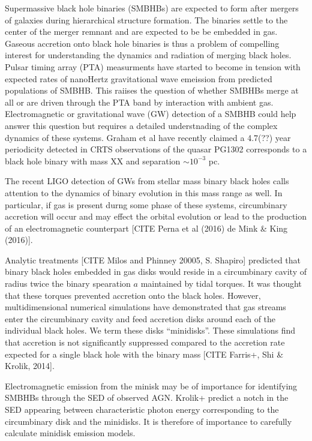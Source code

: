 \documentclass{emulateapj}
\begin{document}
Supermassive black hole binaries (SMBHBs) are expected to form after mergers of galaxies during hierarchical structure formation. The binaries settle to the center of the merger remnant and are expected to be be embedded in gas. Gaseous accretion onto black hole binaries is thus a problem of compelling interest for understanding the dynamics and radiation of merging black holes. Pulsar timing array (PTA) measurments have started to become in tension with expected rates of nanoHertz gravitational wave emeission from predicted populations of SMBHB. This raiises the question of whether SMBHBs merge at all or are driven through the PTA band by interaction with ambient gas. Electromagnetic or gravitational wave (GW) detection of a SMBHB could help answer this question but requires a detailed understnading of the complex dynamics of these systems. Graham et al have recently claimed a 4.7(??) year periodicity detected in CRTS observations of the quasar PG1302 corresponds to a black hole binary with mass XX and separation $\sim 10^{-3}$ pc. 

The recent LIGO detection of GWs from stellar mass binary black holes calls attention to the dynamics of binary evolution in this mass range as well. In particular, if gas is present durng some phase of these systems, circumbinary accretion will occur and may effect the orbital evolution or lead to the production of an electromagnetic counterpart [CITE Perna et al (2016) de Mink \& King (2016)].


Analytic treatments [CITE Milos and Phinney 20005, S. Shapiro] predicted that binary black holes embedded in gas disks would reside in a circumbinary cavity of radius twice the binary spearation $a$ maintained by tidal torques. It was thought that these torques prevented accretion onto the black holes. However, multidimensional numerical simulations \citep{MacFadyen08, Noble12, DOrazio12, Farris14, Farris15A, Farris15B, DOrazio16} have demonstrated that gas streams enter the circumbinary cavity and feed accretion disks around each of the individual black holes. We term these disks ``minidisks''. These simulations find that accretion is not significantly suppressed compared to the accretion rate expected for a single black hole with the binary mass [CITE Farris+, Shi \& Krolik, 2014].

Electromagnetic emission from the minisk may be of importance for identifying SMBHBs through the SED of observed AGN. Krolik+ predict a notch in the SED appearing between characteristic photon energy corresponding to the circumbinary disk and the minidisks. It is therefore of importance to carefully calculate minidisk emission models.
\end{document}
